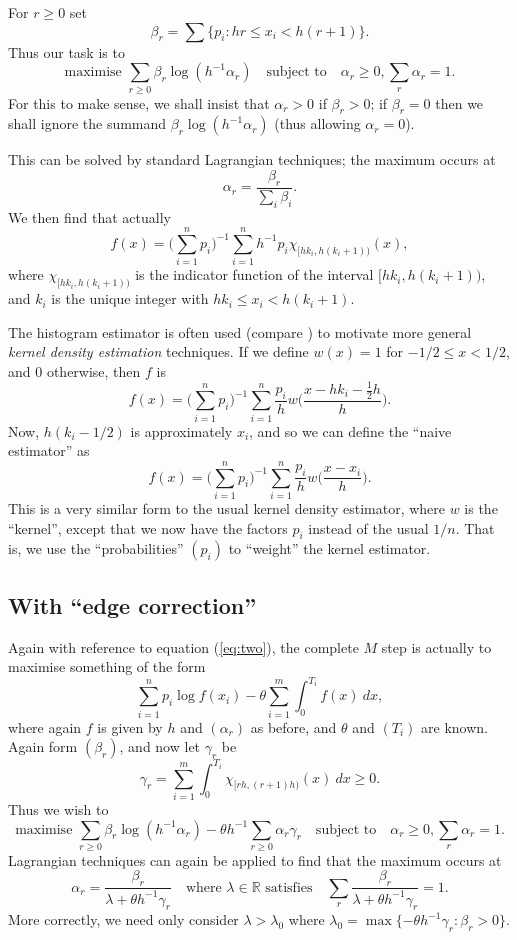 \documentclass[twoside,a4paper]{article}
\theoremstyle{plain}
\theoremstyle{definition}
\begin{document}
For $r\geq 0$ set
\[ \beta_r = \sum \big\{ p_i : hr \leq x_i < h(r+1) \big\}. \]
Thus our task is to
\[ \text{maximise } \sum_{r\geq 0} \beta_r \log(h^{-1}\alpha_r)
\quad\text{subject to}\quad
\alpha_r \geq 0, \sum_r \alpha_r = 1. \]
For this to make sense, we shall insist that $\alpha_r > 0$ if $\beta_r> 0 $; if $\beta_r=0$
then we shall ignore the summand $\beta_r \log(h^{-1}\alpha_r)$ (thus allowing $\alpha_r=0$).

This can be solved by standard Lagrangian techniques; the maximum occurs at
\begin{equation}
\alpha_r = \frac{\beta_r}{\sum_i \beta_i}. \label{eq:three}
\end{equation}
We then find that actually
\[ f(x) = \Big(\sum_{i=1}^n p_i\Big)^{-1}
\sum_{i=1}^n h^{-1} p_i \chi_{[hk_i,h(k_i+1))}(x), \]
where $\chi_{[hk_i,h(k_i+1))}$ is the indicator function of the interval
$[hk_i,h(k_i+1))$, and $k_i$ is the unique integer with $hk_i \leq x_i < h(k_i+1)$.

The histogram estimator is often used (compare \cite[Section~2.4]{sil})
to motivate more general \emph{kernel density estimation} techniques.  
If we define $w(x) = 1$ for $-1/2 \leq x < 1/2$, and $0$ otherwise, then $f$ is
\[ f(x) = \Big(\sum_{i=1}^n p_i\Big)^{-1}
\sum_{i=1}^n \frac{p_i}{h} w\Big( \frac{x-hk_i - \frac12 h}{h} \Big). \]
Now, $h(k_i-1/2)$ is approximately $x_i$, and so we can define the ``naive estimator'' as
\begin{equation}
f(x) = \Big(\sum_{i=1}^n p_i\Big)^{-1}
\sum_{i=1}^n \frac{p_i}{h} w\Big( \frac{x-x_i}{h} \Big).
\label{eq:wkde}
\end{equation}
This is a very similar form to the usual kernel density estimator, where $w$ is the
``kernel'', except that we now have the factors $p_i$ instead of the usual $1/n$.
That is, we use the ``probabilities'' $(p_i)$ to ``weight'' the kernel estimator.



\subsection{With ``edge correction''}\label{app:his_est_edge}

Again with reference to equation (\ref{eq:two}), the complete $M$ step
is actually to maximise something of the form
\[ \sum_{i=1}^n p_i \log f(x_i) - \theta \sum_{i=1}^m \int_0^{T_i} f(x) \ dx, \]
where again $f$ is given by $h$ and $(\alpha_r)$ as before, and $\theta$ and
$(T_i)$ are known.  Again form $(\beta_r)$, and
now let $\gamma_r$ be
\[ \gamma_r = \sum_{i=1}^m \int_0^{T_i} \chi_{[rh,(r+1)h)}(x) \ dx \geq 0. \]
Thus we wish to
\[ \text{maximise } \sum_{r\geq 0} \beta_r \log(h^{-1}\alpha_r)
- \theta h^{-1}\sum_{r\geq 0} \alpha_r \gamma_r
\quad\text{subject to}\quad
\alpha_r \geq 0, \sum_r \alpha_r = 1. \]
Lagrangian techniques can again be applied to find that the maximum occurs at
\[ \alpha_r = \frac{\beta_r}{\lambda + \theta h^{-1}\gamma_r}
\quad\text{where $\lambda\in\mathbb R$ satisfies}\quad
\sum_r \frac{\beta_r}{\lambda + \theta h^{-1}\gamma_r} = 1. \]
More correctly, we need only consider $\lambda > \lambda_0$ where
$\lambda_0 = \max\{ -\theta h^{-1} \gamma_r : \beta_r>0 \}$.
\end{document}
